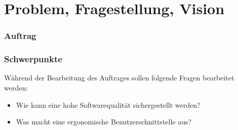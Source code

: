 \chapter{Problem, Fragestellung, Vision}


\subsection{Auftrag}

\subsection{Schwerpunkte}
Während der Bearbeitung des Auftrages sollen folgende Fragen bearbeitet werden:
\begin{itemize}
   \item Wie kann eine hohe Softwarequalität sichergestellt werden?
   \item Was macht eine ergonomische Benutzerschnittstelle aus?
\end{itemize}